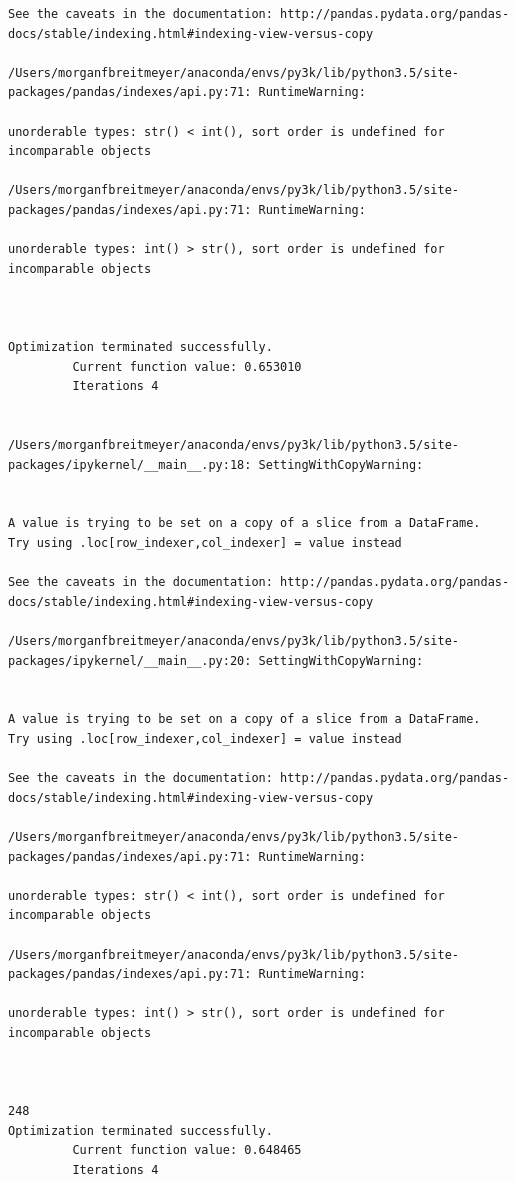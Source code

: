 \begin{lstlisting}
See the caveats in the documentation: http://pandas.pydata.org/pandas-docs/stable/indexing.html#indexing-view-versus-copy

/Users/morganfbreitmeyer/anaconda/envs/py3k/lib/python3.5/site-packages/pandas/indexes/api.py:71: RuntimeWarning:

unorderable types: str() < int(), sort order is undefined for incomparable objects

/Users/morganfbreitmeyer/anaconda/envs/py3k/lib/python3.5/site-packages/pandas/indexes/api.py:71: RuntimeWarning:

unorderable types: int() > str(), sort order is undefined for incomparable objects



Optimization terminated successfully.
         Current function value: 0.653010
         Iterations 4


/Users/morganfbreitmeyer/anaconda/envs/py3k/lib/python3.5/site-packages/ipykernel/__main__.py:18: SettingWithCopyWarning:


A value is trying to be set on a copy of a slice from a DataFrame.
Try using .loc[row_indexer,col_indexer] = value instead

See the caveats in the documentation: http://pandas.pydata.org/pandas-docs/stable/indexing.html#indexing-view-versus-copy

/Users/morganfbreitmeyer/anaconda/envs/py3k/lib/python3.5/site-packages/ipykernel/__main__.py:20: SettingWithCopyWarning:


A value is trying to be set on a copy of a slice from a DataFrame.
Try using .loc[row_indexer,col_indexer] = value instead

See the caveats in the documentation: http://pandas.pydata.org/pandas-docs/stable/indexing.html#indexing-view-versus-copy

/Users/morganfbreitmeyer/anaconda/envs/py3k/lib/python3.5/site-packages/pandas/indexes/api.py:71: RuntimeWarning:

unorderable types: str() < int(), sort order is undefined for incomparable objects

/Users/morganfbreitmeyer/anaconda/envs/py3k/lib/python3.5/site-packages/pandas/indexes/api.py:71: RuntimeWarning:

unorderable types: int() > str(), sort order is undefined for incomparable objects



248
Optimization terminated successfully.
         Current function value: 0.648465
         Iterations 4



\end{lstlisting}
